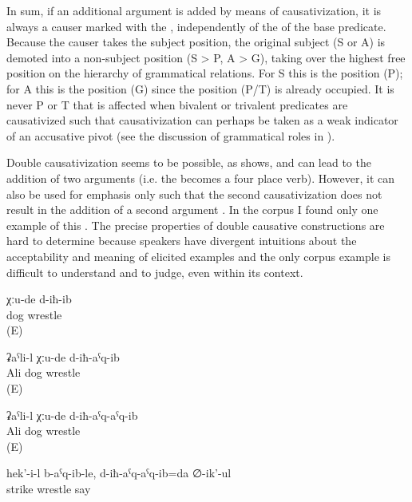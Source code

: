 In sum, if an additional argument is added by means of causativization, it is always a causer marked with the , independently of the  of the base predicate. Because the causer takes the subject position, the original subject (S or A) is demoted into a non-subject position (S > P, A > G), taking over the highest free position on the hierarchy of grammatical relations. For S this is the  position (P); for A this is the  position (G) since the  position (P/T) is already occupied. It is never P or T that is affected when bivalent or trivalent predicates are causativized such that causativization can perhaps be taken as a weak indicator of an accusative pivot (see the discussion of grammatical roles in ).

Double causativization seems to be possible, as  shows, and can lead to the addition of two arguments (i.e. the   becomes a four place verb). However, it can also be used for emphasis only such that the second causativization does not result in the addition of a second argument . In the corpus I found only one example of this . The precise properties of double causative constructions are hard to determine because speakers have divergent intuitions about the acceptability and meaning of elicited examples and the only corpus example  is difficult to understand and to judge, even within its context.

\begin{exe}
	\ex	\label{ex:The dogs fought}
	\gll	χːu-de d-iħ-ib\\
		dog	wrestle\\
	\glt	{} (E)

	\ex	\label{ex:Ali made the dogs fight}
	\gll	ʡaˁli-l χːu-de d-iħ-aˁq-ib\\
		Ali dog	wrestle\\
	\glt	{} (E)

	\ex	\label{ex:Ali made the dogs fight UNCERTAIN INTERPRETATION}
	\gll	ʡaˁli-l χːu-de d-iħ-aˁq-aˁq-ib\\
		Ali dog	wrestle\\
	\glt	{}  (E)

	\ex	\label{ex:‎He hit her and (we) were made to fight, he says}
	\gll	hek'-i-l	b-aˁq-ib-le,	d-iħ-aˁq-aˁq-ib=da	∅-ik'-ul\\
			strike	wrestle	say\\
	\glt	{}
\end{exe}


